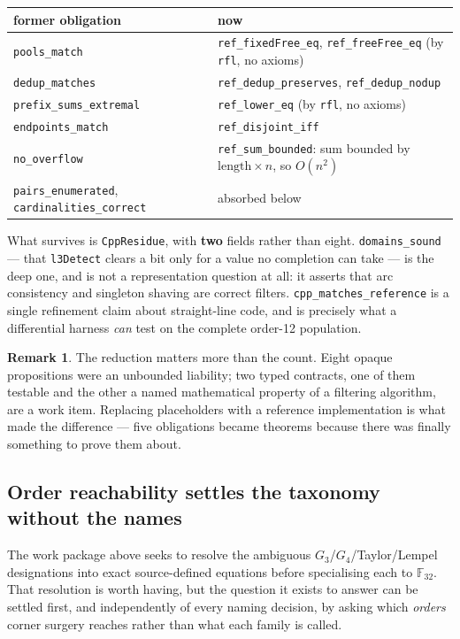 \documentclass[11pt,a4paper]{article}
\theoremstyle{definition}
\newtheorem{remark}[theorem]{Remark}
\newcommand{\F}{\mathbb{F}}
\begin{document}
\begin{center}
\begin{tabular}{@{}ll@{}}
\toprule
former obligation & now \\
\midrule
\texttt{pools\_match} & \texttt{ref\_fixedFree\_eq}, \texttt{ref\_freeFree\_eq} (by \texttt{rfl}, no axioms) \\
\texttt{dedup\_matches} & \texttt{ref\_dedup\_preserves}, \texttt{ref\_dedup\_nodup} \\
\texttt{prefix\_sums\_extremal} & \texttt{ref\_lower\_eq} (by \texttt{rfl}, no axioms) \\
\texttt{endpoints\_match} & \texttt{ref\_disjoint\_iff} \\
\texttt{no\_overflow} & \texttt{ref\_sum\_bounded}: sum bounded by $\text{length}\times n$, so $O(n^2)$ \\
\texttt{pairs\_enumerated}, \texttt{cardinalities\_correct} & absorbed below \\
\bottomrule
\end{tabular}
\end{center}

\noindent What survives is \texttt{CppResidue}, with \textbf{two} fields rather
than eight. \texttt{domains\_sound} --- that \texttt{l3Detect} clears a bit only
for a value no completion can take --- is the deep one, and is not a
representation question at all: it asserts that arc consistency and singleton
shaving are correct filters. \texttt{cpp\_matches\_reference} is a single
refinement claim about straight-line code, and is precisely what a differential
harness \emph{can} test on the complete order-12 population.

\begin{remark}
The reduction matters more than the count. Eight opaque propositions were an
unbounded liability; two typed contracts, one of them testable and the other a
named mathematical property of a filtering algorithm, are a work item. Replacing
placeholders with a reference implementation is what made the difference ---
five obligations became theorems because there was finally something to prove
them about.
\end{remark}


\subsection{Order reachability settles the taxonomy without the names}
\label{sec:reachability}

The work package above seeks to resolve the ambiguous $G_3$/$G_4$/Taylor/Lempel
designations into exact source-defined equations before specialising each to
$\F_{32}$. That resolution is worth having, but the question it exists to answer
can be settled first, and independently of every naming decision, by asking which
\emph{orders} corner surgery reaches rather than what each family is called.
\end{document}
